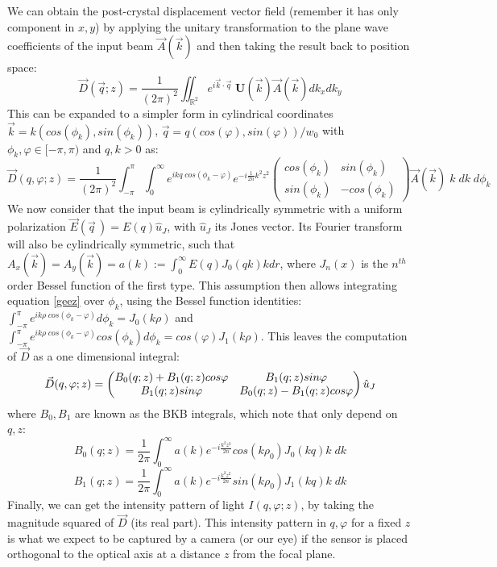 \documentclass[11pt, a4paper, twoside]{article} %
\newcommand{\R}{\mathbb{R}} %
\begin{document}
We can obtain the post-crystal displacement vector field (remember it has only component in $x,y$) by applying the unitary transformation to the plane wave coefficients of the input beam $\vec{A}(\vec{k})$ and then taking the result back to position space:
\begin{equation}
\vec{D}(\vec{q};z)=\frac{1}{(2\pi)^2}\iint_{\R^2}e^{i\vec{k}\cdot\vec{q}}\;\pmb{U}(\vec{k})\vec{A}(\vec{k})dk_xdk_y
\end{equation}
This can be expanded to a simpler form in cylindrical coordinates $\vec{k}=k(cos(\phi_k),sin(\phi_k))$, $\vec{q}=q(cos(\varphi), sin(\varphi))/w_0$ with $\phi_k,\varphi\in[-\pi,\pi)$ and $q,k>0$ as:
\begin{equation}\label{geez}
\vec{D}(q,\varphi;z)=\frac{1}{(2\pi)^2}\int_{-\pi}^{\pi}\int_{0}^\infty e^{ikq \;cos(\phi_k-\varphi)}e^{-i\frac{1}{2n}k^2z^2}\begin{pmatrix}
cos(\phi_k) & sin(\phi_k)\\
sin(\phi_k) & -cos(\phi_k)
\end{pmatrix} \vec{A}(\vec{k})\;k\;dk\;d\phi_k
\end{equation}
We now consider that the input beam is cylindrically symmetric with a uniform polarization $\vec{E}(\vec{q}\,)=E(q)\hat{u}_J$, with $\hat{u}_J$ its Jones vector. Its Fourier transform will also be cylindrically symmetric, such that $A_x(\vec{k})=A_y(\vec{k})=a(k):=\int_0^\infty E(q)J_0(qk)k dr$, where $J_n(x)$ is the $n^{th}$ order Bessel function of the first type. This assumption then allows integrating equation \eqref{geez}
over $\phi_k$, using the Bessel function identities: $\int_{-\pi}^{\pi}e^{ik\rho\;cos(\phi_k-\varphi)}d\phi_k=J_0(k\rho)$ and $\int_{-\pi}^{\pi}e^{ik\rho\;cos(\phi_k-\varphi)}cos(\phi_k)d\phi_k=cos(\varphi)J_1(k\rho)$. This leaves the computation of $\vec{D}$ as a one dimensional integral:\vspace{0.1cm}
\begin{equation}\label{master}
\vec{D}(q, \varphi;z)=\begin{pmatrix}
B_0(q;z)+B_1(q;z)cos\varphi & B_1(q;z) sin\varphi\\
B_1(q;z)sin\varphi & B_0(q;z)-B_1(q;z)cos\varphi
\end{pmatrix}\hat{u}_J\vspace{0.1cm}
\end{equation}
where $B_0,B_1$ are known as the BKB integrals, which note that only depend on $q,z$:
\begin{equation}\label{bkb1}
B_0(q;z)=\frac{1}{2\pi}\int_0^\infty a(k)e^{-i\frac{k^2z^2}{2n}}cos(k\rho_0)J_0(kq)k\;dk
\end{equation}
\begin{equation}\label{bkb2}
B_1(q;z)=\frac{1}{2\pi}\int_0^\infty a(k)e^{-i\frac{k^2z^2}{2n}}sin(k\rho_0)J_1(kq)k\;dk
\end{equation}
Finally, we can get the intensity pattern of light $I(q,\varphi;z)$, by taking the magnitude squared of $\vec{D}$ (its real part). This intensity pattern in $q,\varphi$ for a fixed $z$ is what we expect to be captured by a camera (or our eye) if the sensor is placed orthogonal to the optical axis at a distance $z$ from the focal plane.
\end{document}
